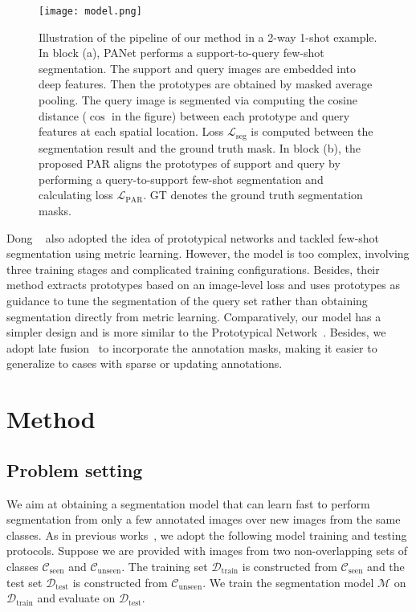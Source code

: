 \documentclass[10pt,twocolumn,letterpaper]{article}
\begin{document}
\begin{figure*}[t!]
\begin{center}
   \texttt{[image: model.png]}
\end{center}
   \caption{Illustration of the pipeline of our method in a 2-way 1-shot example. In block (a), PANet performs a support-to-query few-shot segmentation. The support and query images are embedded into deep features. Then the prototypes are obtained by masked average pooling. The query image is segmented via computing the cosine distance ($\cos$ in the figure) between each prototype and query features at each spatial location. Loss $\mathcal{L}_{\text{seg}}$ is computed between the segmentation result and the ground truth mask. In block (b), the proposed PAR aligns the prototypes of support and query by performing a query-to-support few-shot segmentation and calculating loss $\mathcal{L}_{\text{PAR}}$. GT denotes the ground truth segmentation masks.}
\label{fig:model}
\end{figure*}

Dong \etal~\cite{dong2018few} also adopted the idea of prototypical networks and tackled few-shot segmentation using metric learning. However, the model is too complex, involving three training stages and complicated training configurations. Besides, their method extracts prototypes based on an image-level loss and uses prototypes as guidance to tune the segmentation of the query set rather than obtaining segmentation directly from metric learning. Comparatively, our model has a simpler design and is more similar to the Prototypical Network~\cite{snell2017prototypical}. Besides, we adopt late fusion~\cite{rakelly2018few} to incorporate the annotation masks, making it easier to generalize to cases with sparse or updating annotations.






\section{Method}

\subsection{Problem setting}
We aim at obtaining a segmentation model that can learn fast to perform segmentation from only a few annotated images over new images from the same classes. As in previous works~\cite{shaban2017one},
we adopt the following model training and testing protocols. Suppose we are provided with images from two non-overlapping sets of classes $\mathcal{C}_{\text{seen}}$ and $\mathcal{C}_{\text{unseen}}$. The training set $\mathcal{D}_{\text{train}}$ is constructed from $\mathcal{C}_{\text{seen}}$ and the test set $\mathcal{D}_{\text{test}}$ is constructed from $\mathcal{C}_{\text{unseen}}$. We train the segmentation model $\mathcal{M}$  on $\mathcal{D}_{\text{train}}$ and evaluate on $\mathcal{D}_{\text{test}}$. 
 
\end{document}
